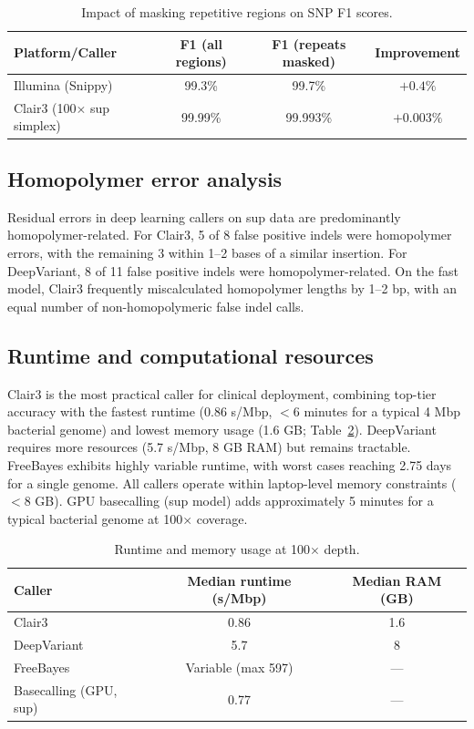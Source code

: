 \documentclass[11pt]{article}
\begin{document}
\begin{table}[htbp]
\centering
\caption{Impact of masking repetitive regions on SNP F1 scores.}
\label{tab:errors}
\begin{tabular}{@{}lccc@{}}
\toprule
Platform/Caller & F1 (all regions) & F1 (repeats masked) & Improvement \\
\midrule
Illumina (Snippy) & 99.3\% & 99.7\% & $+0.4\%$ \\
Clair3 (100$\times$ sup simplex) & 99.99\% & 99.993\% & $+0.003\%$ \\
\bottomrule
\end{tabular}
\end{table}

\subsection{Homopolymer error analysis}

Residual errors in deep learning callers on sup data are predominantly homopolymer-related. For Clair3, 5 of 8 false positive indels were homopolymer errors, with the remaining 3 within 1--2 bases of a similar insertion. For DeepVariant, 8 of 11 false positive indels were homopolymer-related. On the fast model, Clair3 frequently miscalculated homopolymer lengths by 1--2 bp, with an equal number of non-homopolymeric false indel calls.

\subsection{Runtime and computational resources}

Clair3 is the most practical caller for clinical deployment, combining top-tier accuracy with the fastest runtime (0.86 s/Mbp, $<$6 minutes for a typical 4 Mbp bacterial genome) and lowest memory usage (1.6 GB; Table~\ref{tab:runtime}). DeepVariant requires more resources (5.7 s/Mbp, 8 GB RAM) but remains tractable. FreeBayes exhibits highly variable runtime, with worst cases reaching 2.75 days for a single genome. All callers operate within laptop-level memory constraints ($<$8 GB). GPU basecalling (sup model) adds approximately 5 minutes for a typical bacterial genome at 100$\times$ coverage.

\begin{table}[htbp]
\centering
\caption{Runtime and memory usage at 100$\times$ depth.}
\label{tab:runtime}
\begin{tabular}{@{}lcc@{}}
\toprule
Caller & Median runtime (s/Mbp) & Median RAM (GB) \\
\midrule
Clair3      & 0.86 & 1.6 \\
DeepVariant & 5.7  & 8   \\
FreeBayes   & Variable (max 597) & --- \\
Basecalling (GPU, sup) & 0.77 & --- \\
\bottomrule
\end{tabular}
\end{table}
\end{document}
